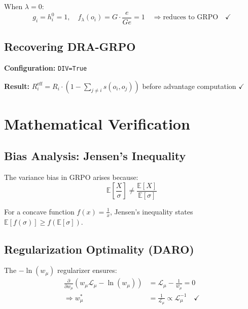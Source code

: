 \documentclass[11pt,a4paper]{article}
\begin{document}
When $\lambda = 0$:
\begin{equation}
g_i = h_i^0 = 1, \quad f_\lambda(o_i) = G \cdot \frac{e}{Ge} = 1 \quad \Rightarrow \text{reduces to GRPO} \quad \checkmark
\end{equation}

\subsection{Recovering DRA-GRPO}

\textbf{Configuration:} \texttt{DIV=True}

\textbf{Result:} $R_i^{\text{eff}} = R_i \cdot (1 - \sum_{j \neq i} s(o_i, o_j))$ before advantage computation $\checkmark$

\newpage


\section{Mathematical Verification}

\subsection{Bias Analysis: Jensen's Inequality}

The variance bias in GRPO arises because:
\begin{equation}
\mathbb{E}\left[\frac{X}{\sigma}\right] \neq \frac{\mathbb{E}[X]}{\mathbb{E}[\sigma]}
\end{equation}

For a concave function $f(x) = \frac{1}{x}$, Jensen's inequality states $\mathbb{E}[f(\sigma)] \geq f(\mathbb{E}[\sigma])$.

\subsection{Regularization Optimality (DARO)}

The $-\ln(w_\mu)$ regularizer ensures:
\begin{align}
\frac{\partial}{\partial w_\mu}\left(w_\mu \mathcal{L}_\mu - \ln(w_\mu)\right) &= \mathcal{L}_\mu - \frac{1}{w_\mu} = 0 \\
\Rightarrow w_\mu^* &= \frac{1}{\mathcal{L}_\mu} \propto \mathcal{L}_\mu^{-1} \quad \checkmark
\end{align}
\end{document}
